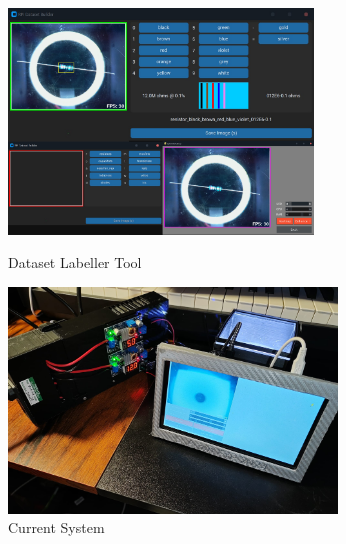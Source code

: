 \begin{figure}[t]
  \begin{minipage}[t]{0.49\textwidth}
      \centering
      \includegraphics[width=\textwidth,height=6cm,keepaspectratio]{imgs/software/tools.png}
      \caption{Dataset Labeller Tool}
      \label{fig:customtool}
  \end{minipage}
  \hfill
  \begin{minipage}[t]{0.49\textwidth}
    \centering
    \includegraphics[width=\textwidth,height=6cm,keepaspectratio]{imgs/design/allparts.jpeg}
    \caption{Current System}
    \label{fig:allparts}
  \end{minipage}
  \hfill
\end{figure}

